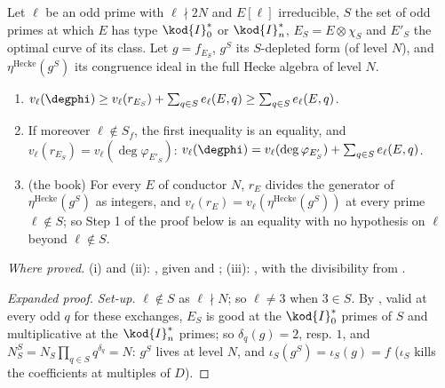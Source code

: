 \begin{sloppypar}
\begin{theorem}\label{thm:paper:quant}
Let $\ell$ be an odd prime with $\ell\nmid2N$ and $E[\ell]$ irreducible, $S$ the set of odd primes at which $E$ has type $\kod{I}_0^*$ or $\kod{I}_n^*$, $E_S=E\otimes\chi_S$ and $E'_S$ the optimal curve of
its class. Let $g=f_{E_S}$, $g^S$ its $S$-depleted form (of level $N$), and $\eta^{\mathrm{Hecke}}(g^S)$ its congruence ideal in the full Hecke algebra of level $N$.
\begin{enumerate}[label=(\roman*)]
\item $v_\ell(\degphi)\ge v_\ell(r_{E_S})+\sum_{q\in S}e_\ell(E,q)\ge\sum_{q\in S}e_\ell(E,q)$.
\item If moreover $\ell\notin S_f$, the first inequality is an equality, and $v_\ell(r_{E_S})=v_\ell(\deg\varphi_{E'_S})$: $v_\ell(\degphi)=v_\ell(\deg\varphi_{E'_S})+\sum_{q\in S}e_\ell(E,q)$.
\item (the book) For every $E$ of conductor $N$, $r_E$ divides the generator of $\eta^{\mathrm{Hecke}}(g^S)$ as integers, and $v_\ell(r_E)=v_\ell(\eta^{\mathrm{Hecke}}(g^S))$ at every prime $\ell\notin S$; so
Step 1 of the proof below is an equality with no hypothesis on $\ell$ beyond $\ell\notin S$.
\end{enumerate}
\end{theorem}

\noindent\emph{Where proved.} (i) and (ii): , given  and ; (iii): , with the divisibility from
.

\begin{proof}[Expanded proof]
\emph{Set-up.} $\ell\notin S$ as $\ell\nmid N$; so $\ell\ne3$ when $3\in S$. By , valid at every odd $q$ for these exchanges, $E_S$ is good at the $\kod{I}_0^*$ primes of $S$
and multiplicative at the $\kod{I}_n^*$ primes; so $\delta_q(g)=2$, resp. $1$, and $N_S^S=N_S\prod_{q\in S}q^{\delta_q}=N$: $g^S$ lives at level $N$, and $\iota_S(g^S)=\iota_S(g)=f$ ($\iota_S$ kills the coefficients at
multiples of $D$).


\end{proof}
\end{sloppypar}
